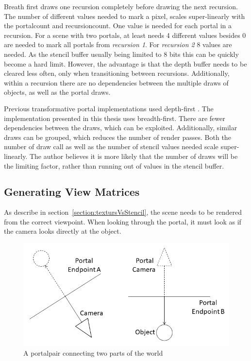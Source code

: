 Breath first draws one recursion completely before drawing the next recursion. The number of different values needed to mark a pixel, scales super-linearly with the \gls{portalcount} and \gls{recursioncount}. One value is needed for each portal in a recursion. For a scene with two portals, at least needs 4 different values besides 0 are needed to mark all portals from \textit{recursion 1}. For \textit{recursion 2} 8 values are needed. As the stencil buffer usually being limited to 8 bits this can be quickly become a hard limit. However, the advantage is that the depth buffer needs to be cleared less often, only when transitioning between recursions. Additionally, within a recursion there are no dependencies between the multiple draws of objects, as well as the portal draws.

Previous transformative portal implementations used depth-first \cite{lowe:2005:technique,lecture:portalProblems}. The implementation presented in this thesis uses breadth-first. There are fewer dependencies between the draws, which can be exploited. Additionally, similar draws can be grouped, which reduces the number of render passes. Both the number of draw call as well as the number of stencil values needed scale super-linearly. The author believes it is more likely that the number of draws will be the limiting factor, rather than running out of values in the stencil buffer.



\subsection{Generating View Matrices}
\label{section:generatingviewmatrices}


As describe in section~\ref{section:textursVsStencil}, the scene needs to be rendered from the correct viewpoint. When looking through the portal, it must look as if the camera looks directly at the object.

\begin{figure}[H]
	\includegraphics[width=\linewidth]{images/portal.png}
	\caption{A \gls{portalpair} connecting two parts of the world}
	\label{fig:portal}
\end{figure}


